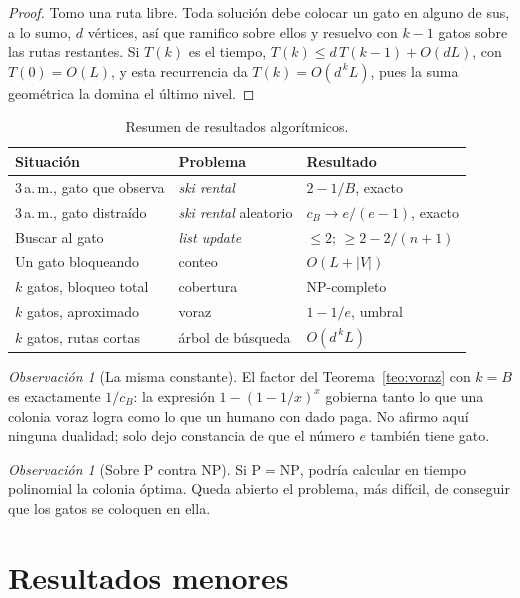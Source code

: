 \documentclass[11pt,a4paper]{article}
\theoremstyle{plain}
\theoremstyle{definition}
\theoremstyle{remark}
\newtheorem{observacion}[teorema]{Observación}
\numberwithin{equation}{section}
\begin{document}
\begin{proof}
Tomo una ruta libre. Toda solución debe colocar un gato en alguno de sus, a lo sumo, $d$ vértices, así que ramifico sobre ellos y resuelvo con $k-1$ gatos sobre las rutas restantes. Si $T(k)$ es el tiempo, $T(k)\le d\,T(k-1)+O(dL)$, con $T(0)=O(L)$, y esta recurrencia da $T(k)=O(d^{\,k}L)$, pues la suma geométrica la domina el último nivel.
\end{proof}

\begin{table}[ht]
\centering
\caption{Resumen de resultados algorítmicos.}\label{tab:algoritmos}
\begin{tabular}{lll}
\toprule
Situación & Problema & Resultado \\
\midrule
3\,a.\,m., gato que observa & \emph{ski rental} & $2-1/B$, exacto \\
3\,a.\,m., gato distraído & \emph{ski rental} aleatorio & $c_B\to e/(e-1)$, exacto \\
Buscar al gato & \emph{list update} & $\le 2$; $\ge 2-2/(n+1)$ \\
Un gato bloqueando & conteo & $O(L+|V|)$ \\
$k$ gatos, bloqueo total & cobertura & NP-completo \\
$k$ gatos, aproximado & voraz & $1-1/e$, umbral \\
$k$ gatos, rutas cortas & árbol de búsqueda & $O(d^{\,k}L)$ \\
\bottomrule
\end{tabular}
\end{table}

\begin{observacion}[La misma constante]
El factor del Teorema~\ref{teo:voraz} con $k=B$ es exactamente $1/c_B$: la expresión $1-(1-1/x)^x$ gobierna tanto lo que una colonia voraz logra como lo que un humano con dado paga. No afirmo aquí ninguna dualidad; solo dejo constancia de que el número $e$ también tiene gato.
\end{observacion}

\begin{observacion}[Sobre P contra NP]
Si $\mathrm{P}=\mathrm{NP}$, podría calcular en tiempo polinomial la colonia óptima. Queda abierto el problema, más difícil, de conseguir que los gatos se coloquen en ella.
\end{observacion}

\section{Resultados menores}\label{sec:menores}
\end{document}
